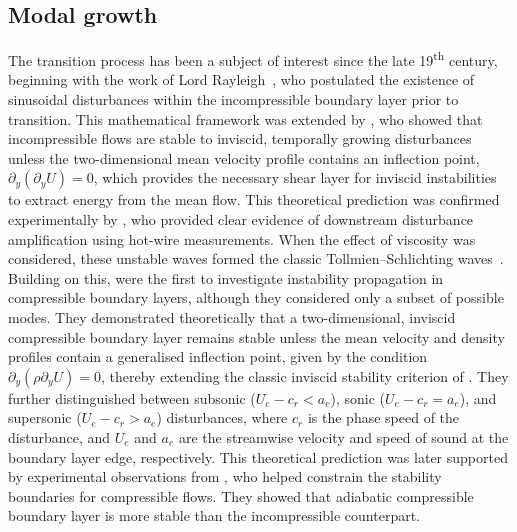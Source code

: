 \subsection{Modal growth}
The transition process has been a subject of interest since the late 19\textsuperscript{th} century, beginning with the work of Lord Rayleigh~\citep{Rayleigh1878,Rayleigh1880}, who postulated the existence of sinusoidal disturbances within the incompressible boundary layer prior to transition. This mathematical framework was extended by \citet{Tollmien1936}, who showed that incompressible flows are stable to inviscid, temporally growing disturbances unless the two-dimensional mean velocity profile contains an inflection point, $\partial_y (\partial_y U) = 0$, which provides the necessary shear layer for inviscid instabilities to extract energy from the mean flow. This theoretical prediction was confirmed experimentally by \citet{Schubauer1948}, who provided clear evidence of downstream disturbance amplification using hot-wire measurements. When the effect of viscosity was considered, these unstable waves formed the classic Tollmien–Schlichting waves~\citep{Schlichting2000}. Building on this, \citet{LeesLin1946} were the first to investigate instability propagation in compressible boundary layers, although they considered only a subset of possible modes. They demonstrated theoretically that a two-dimensional, inviscid compressible boundary layer remains stable unless the mean velocity and density profiles contain a generalised inflection point, given by the condition $\partial_y ( \rho \partial_y U) = 0$, thereby extending the classic inviscid stability criterion of \citet{Tollmien1936}. They further distinguished between subsonic ($U_e - c_r < a_e$), sonic ($U_e - c_r = a_e$), and supersonic ($U_e - c_r > a_e$) disturbances, where $c_r$ is the phase speed of the disturbance, and $U_e$ and $a_e$ are the streamwise velocity and speed of sound at the boundary layer edge, respectively. This theoretical prediction was later supported by experimental observations from \citet{Laufer1960}, who helped constrain the stability boundaries for compressible flows. They showed that adiabatic compressible boundary layer is more stable than the incompressible counterpart. 



